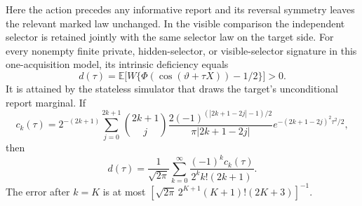 \begin{theorem}
\label{thm:v16-exactphysical}
Here the action precedes any informative report and its reversal
symmetry leaves the relevant marked law unchanged. In the visible
comparison the independent selector is retained jointly with the same
selector law on the target side. For every nonempty finite private,
hidden-selector, or visible-selector signature in this one-acquisition model, its intrinsic deficiency equals
\begin{equation}\label{eq:v16-delta}
 d(\tau)=\mathbb E\bigl[W\{\Phi(\cos(\vartheta+\tau X))-1/2\}\bigr]>0.
\end{equation}
It is attained by the stateless simulator that draws the target's
unconditional report marginal. If
\[
 c_k(\tau)=2^{-(2k+1)}\sum_{j=0}^{2k+1}\binom{2k+1}{j}
 \frac{2(-1)^{(|2k+1-2j|-1)/2}}{\pi|2k+1-2j|}
 e^{-(2k+1-2j)^2\tau^2/2},
\]
then
\begin{equation}\label{eq:v16-series}
 d(\tau)=\frac1{\sqrt{2\pi}}
      \sum_{k=0}^\infty\frac{(-1)^kc_k(\tau)}{2^kk!(2k+1)}.
\end{equation}
The error after $k=K$ is at most
$[\sqrt{2\pi}\,2^{K+1}(K+1)!(2K+3)]^{-1}$.
\end{theorem}
